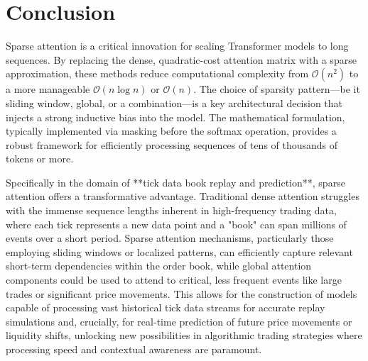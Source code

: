 \documentclass{article}
\begin{document}
\section{Conclusion}

Sparse attention is a critical innovation for scaling Transformer models to long sequences. By replacing the dense, quadratic-cost attention matrix with a sparse approximation, these methods reduce computational complexity from \(\mathcal{O}(n^2)\) to a more manageable \(\mathcal{O}(n \log n)\) or \(\mathcal{O}(n)\). The choice of sparsity pattern—be it sliding window, global, or a combination—is a key architectural decision that injects a strong inductive bias into the model. The mathematical formulation, typically implemented via masking before the softmax operation, provides a robust framework for efficiently processing sequences of tens of thousands of tokens or more.

Specifically in the domain of **tick data book replay and prediction**, sparse attention offers a transformative advantage. Traditional dense attention struggles with the immense sequence lengths inherent in high-frequency trading data, where each tick represents a new data point and a "book" can span millions of events over a short period. Sparse attention mechanisms, particularly those employing sliding windows or localized patterns, can efficiently capture relevant short-term dependencies within the order book, while global attention components could be used to attend to critical, less frequent events like large trades or significant price movements. This allows for the construction of models capable of processing vast historical tick data streams for accurate replay simulations and, crucially, for real-time prediction of future price movements or liquidity shifts, unlocking new possibilities in algorithmic trading strategies where processing speed and contextual awareness are paramount.
\end{document}
